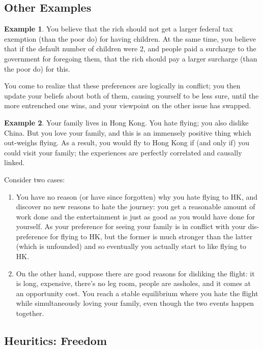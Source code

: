 \documentclass{article}
\theoremstyle{plain}
\theoremstyle{definition}
\newtheorem{example}{Example}[section]
\theoremstyle{remark}
\begin{document}
	\subsection{Other Examples}
	\begin{example}
		You believe that the rich should not get a larger federal tax exemption (than the poor do) for having children.
		At the same time, you believe that if the default number of children were 2, and people paid a surcharge to the government for foregoing them, that the rich should pay a larger surcharge (than the poor do) for this.
		
		You come to realize that these preferences are logically in conflict; you then update your beliefs about both of them, causing yourself to be less sure, until the more entrenched one wins, and your viewpoint on the other issue has swapped.
	\end{example}

	\begin{example}
		Your family lives in Hong Kong. You hate flying; you also dislike China. But you love your family, and this is an immensely positive thing which out-weighs flying. As a result, you would fly to Hong Kong if (and only if) you could visit your family; the experiences are perfectly correlated and causally linked.
		
		Consider two cases:
		\begin{enumerate}[nosep]
			\item You have no reason (or have since forgotten) why you hate flying to HK, and discover no new reasons to hate the journey: you get a reasonable amount of work done and the entertainment is just as good as you would have done for yourself. As your preference for seeing your family is in conflict with your dis-preference for flying to HK, but the former is much stronger than the latter (which is unfounded) and so eventually you actually start to like flying to HK.
			\item On the other hand, suppose there are good reasons for disliking the flight: it is long, expensive, there's no leg room, people are assholes, and it comes at an opportunity cost. You reach a stable equilibrium where you hate the flight while simultaneously loving your family, even though the two events happen together.
		\end{enumerate}
	\end{example}

	\subsection{Heuritics: Freedom}
	
\end{document}
